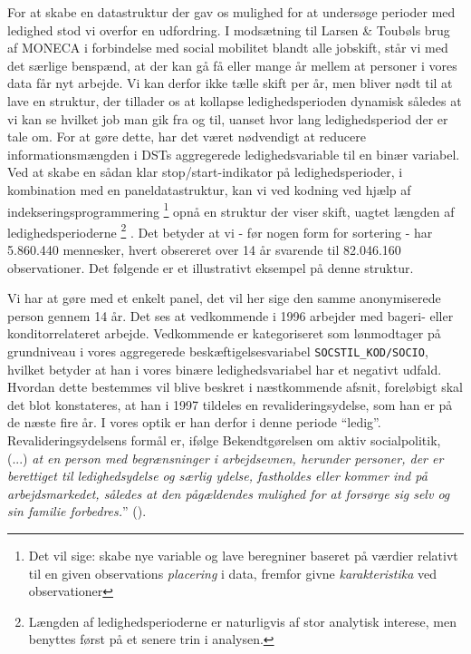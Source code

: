 For at skabe en datastruktur der gav os mulighed for at undersøge perioder med ledighed stod vi overfor en udfordring. I modsætning til Larsen \& Toubøls brug af MONECA i forbindelse med social mobilitet blandt alle jobskift, står vi med det særlige benspænd, at der kan gå få eller mange år mellem at personer i vores data får nyt arbejde. Vi kan derfor ikke tælle skift per år, men bliver nødt til at lave en struktur, der tillader os at kollapse ledighedsperioden dynamisk således at vi kan se hvilket job man gik fra og til, uanset hvor lang ledighedsperiod der er tale om. For at gøre dette, har det været nødvendigt at reducere informationsmængden i DSTs aggregerede ledighedsvariable til en binær variabel. Ved at skabe en sådan klar stop/start-indikator på ledighedsperioder, i kombination med en paneldatastruktur, kan vi ved kodning ved hjælp af indekseringsprogrammering%
%
\footnote{Det vil sige: skabe nye variable og lave beregniner baseret på værdier relativt til en given observations \emph{placering} i data, fremfor givne \emph{karakteristika} ved observationer}%
%
 opnå en struktur der viser skift, uagtet længden af ledighedsperioderne%
%
\footnote{Længden af ledighedsperioderne er naturligvis af stor analytisk interese, men benyttes først på et senere trin i analysen.}%
%
. Det betyder at vi - før nogen form for sortering - har 5.860.440 mennesker, hvert obsereret over 14 år svarende til 82.046.160 observationer. Det følgende er et illustrativt eksempel på denne struktur. 
%

%
Vi har at gøre med et enkelt panel, det vil her sige den samme anonymiserede person gennem 14 år. Det ses at vedkommende i 1996 arbejder med bageri- eller konditorrelateret arbejde. Vedkommende er kategoriseret som lønmodtager på grundniveau i vores aggregerede beskæftigelsesvariabel \texttt{SOCSTIL\_KOD/SOCIO}, hvilket betyder at han i vores binære ledighedsvariabel har et negativt udfald. Hvordan dette bestemmes vil blive beskret i næstkommende afsnit, foreløbigt skal det blot konstateres, at han i 1997 tildeles en revalideringsydelse, som han er på de næste fire år. I vores optik er han derfor i denne periode “ledig”. Revalideringsydelsens formål er, ifølge Bekendtgørelsen om aktiv socialpolitik, (...) \emph{at en person med begrænsninger i arbejdsevnen, herunder personer, der er berettiget til ledighedsydelse og særlig ydelse, fastholdes eller kommer ind på arbejdsmarkedet, således at den pågældendes mulighed for at forsørge sig selv og sin familie forbedres.}” (\textcite{lov_revalidering}).


